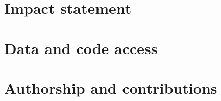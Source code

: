 \documentclass[11pt]{report}
\begin{document}

\chapter*{Impact statement}%

\chapter*{Data and code access}

\chapter*{Authorship and contributions}




\clearpage
\tableofcontents

\clearpage
\listoftables

\clearpage
\listoffigures


%
\end{document}
